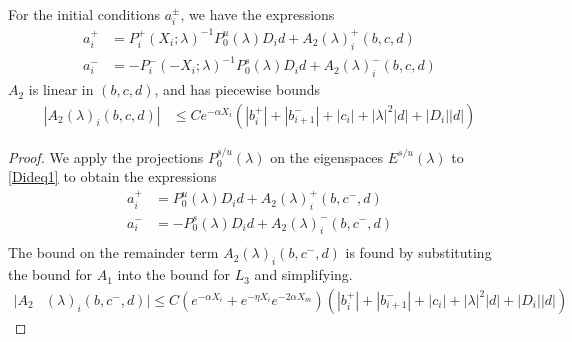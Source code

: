 \documentclass[thesis.tex]{subfiles}
\begin{document}
\begin{lemma}\label{lemma:aipm}
For the initial conditions $a_i^\pm$, we have the expressions
\begin{equation}\label{aipmexp1}
\begin{aligned}
a_i^+ &= P_i^+(X_i; \lambda)^{-1} P_0^u(\lambda) D_i d + A_2(\lambda)_i^+(b, c, d) \\
a_i^- &= -P_i^-(-X_i; \lambda)^{-1} P_0^s(\lambda) D_i d + A_2(\lambda)_i^-(b, c, d)
\end{aligned}
\end{equation}
$A_2$ is linear in $(b, c, d)$, and has piecewise bounds
\begin{align}
|A_2(\lambda)_i(b, c, d)|
&\leq C e^{-\alpha X_i} \left( |b_i^+| + |b_{i+1}^-| + |c_i| + |\lambda|^2|d| + |D_i||d| \right) \label{A2bound}
\end{align}

\begin{proof}
We apply the projections $P_0^{s/u}(\lambda)$ on the eigenspaces $E^{s/u}(\lambda)$ to \eqref{Dideq1} to obtain the expressions
\begin{align*}
a_i^+ &= P_0^u(\lambda) D_i d + A_2(\lambda)_i^+(b, c^-, d) \\
a_i^- &= -P_0^s(\lambda) D_i d + A_2(\lambda)_i^-(b, c^-, d) \\
\end{align*}
The bound on the remainder term $A_2(\lambda)_i(b, c^-, d)$ is found by substituting the bound for $A_1$ into the bound for $L_3$ and simplifying. 
\begin{align*}
|A_2&(\lambda)_i(b, c^-, d)|
\leq C (e^{-\alpha X_i} + e^{-\eta X_i}e^{-2\alpha X_m}) \left( |b_i^+| + |b_{i+1}^-| + |c_i| + |\lambda|^2|d| + |D_i||d| \right)
\end{align*} 


\end{proof}
\end{lemma}
\end{document}
